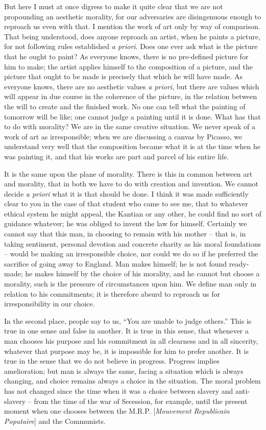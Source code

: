 \documentclass[12pt]{article}
\begin{document}
But here I must at once digress to make it quite clear that we are not propounding an aesthetic morality, for our adversaries are disingenuous enough to reproach us even with that. I mention the work of art only by way of comparison. That being understood, does anyone reproach an artist, when he paints a picture, for not following rules established \textit{a priori}. Does one ever ask what is the picture that he ought to paint? As everyone knows, there is no pre-defined picture for him to make; the artist applies himself to the composition of a picture, and the picture that ought to be made is precisely that which he will have made. As everyone knows, there are no aesthetic values \textit{a priori}, but there are values which will appear in due course in the coherence of the picture, in the relation between the will to create and the finished work. No one can tell what the painting of tomorrow will be like; one cannot judge a painting until it is done. What has that to do with morality? We are in the same creative situation. We never speak of a work of art as irresponsible; when we are discussing a canvas by Picasso, we understand very well that the composition became what it is at the time when he was painting it, and that his works are part and parcel of his entire life.

It is the same upon the plane of morality. There is this in common between art and morality, that in both we have to do with creation and invention. We cannot decide \textit{a priori} what it is that should be done. I think it was made sufficiently clear to you in the case of that student who came to see me, that to whatever ethical system he might appeal, the Kantian or any other, he could find no sort of guidance whatever; he was obliged to invent the law for himself. Certainly we cannot say that this man, in choosing to remain with his mother – that is, in taking sentiment, personal devotion and concrete charity as his moral foundations – would be making an irresponsible choice, nor could we do so if he preferred the sacrifice of going away to England. Man makes himself; he is not found ready-made; he makes himself by the choice of his morality, and he cannot but choose a morality, such is the pressure of circumstances upon him. We define man only in relation to his commitments; it is therefore absurd to reproach us for irresponsibility in our choice.

In the second place, people say to us, “You are unable to judge others.” This is true in one sense and false in another. It is true in this sense, that whenever a man chooses his purpose and his commitment in all clearness and in all sincerity, whatever that purpose may be, it is impossible for him to prefer another. It is true in the sense that we do not believe in progress. Progress implies amelioration; but man is always the same, facing a situation which is always changing, and choice remains always a choice in the situation. The moral problem has not changed since the time when it was a choice between slavery and anti-slavery – from the time of the war of Secession, for example, until the present moment when one chooses between the M.R.P. [\textit{Mouvement Republicain Poputaire}] and the Communists.
\end{document}
